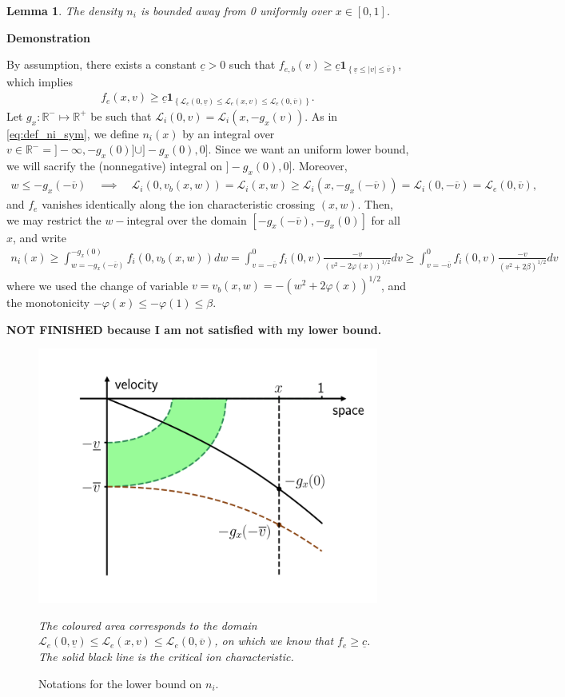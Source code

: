\documentclass{article}
\newtheorem{lem}{Lemma}[section]
\numberwithin{equation}{section}
\newcommand{\todo}[1]{{\color{red}\textbf{#1}}}
\newcommand{\mysubcaption}[1]{
	\vspace*{5pt}
	\begin{minipage}{0.8\linewidth}
		\begin{center}
			\footnotesize\emph{#1}
		\end{center}
	\end{minipage}
}
\newcommand{\myproof}[1]{
	\noindent \textbf{Demonstration}
	{\small	#1 \hfill \qedsymbol}
}
\newcommand{\domfel}{{\underline{v}}} %
\newcommand{\domfeu}{{\overline{v}}} %
\newcommand{\minfe}{{\underline{c}}} %
\begin{document}
\begin{lem}
	The density $n_i$ is bounded away from 0 uniformly over $x\in[0,1]$.
\end{lem}

\myproof{
	By assumption, there exists a constant $\minfe>0$ such that $f_{e,b} (v) \geqslant \minfe \textbf{1}_{\left\{\domfel \leqslant |v| \leqslant \domfeu\right\}}$, which implies
	\begin{align*}
		f_e(x,v) \geqslant \minfe \textbf{1}_{\left\{\mathcal{L}_e(0,\domfel) \leqslant \mathcal{L}_e(x,v) \leqslant \mathcal{L}_e(0,\domfeu)\right\}}.
	\end{align*}
	Let $g_x : \mathbb{R}^{-} \mapsto \mathbb{R}^+$ be such that $\mathcal{L}_i(0,v) = \mathcal{L}_i(x,-g_x(v))$. As in \cref{eq:def_ni_sym}, we define $n_i(x)$ by an integral over $v\in\mathbb{R}^{-} = ]-\infty,-g_x(0)] \cup ]-g_x(0),0]$. Since we want an uniform lower bound, we will sacrify the (nonnegative) integral on $]-g_x(0),0]$. Moreover, 
	\begin{align*}
		w \leqslant -g_x(-\domfeu) \quad\implies\quad \mathcal{L}_i(0,v_b(x,w)) = \mathcal{L}_i(x,w) \geqslant \mathcal{L}_i(x,-g_x(-\domfeu)) = \mathcal{L}_i(0,-\domfeu) = \mathcal{L}_e(0,\domfeu),
	\end{align*}
	and $f_e$ vanishes identically along the ion characteristic crossing $(x,w)$. Then, we may restrict the $w-$integral over the domain $[-g_x(-\domfeu),-g_x(0)]$ for all $x$, and write
	\begin{align*}
		n_i(x) \geqslant \int_{w=-g_x(-\domfeu)}^{-g_x(0)} f_i(0,v_b(x,w)) dw = \int_{v=-\domfeu}^{0} f_i(0,v) \frac{-v}{\left(v^2 - 2 \varphi(x)\right)^{1/2}} dv \geqslant \int_{v=-\domfeu}^{0} f_i(0,v) \frac{-v}{\left(v^2 + 2 \beta\right)^{1/2}} dv
	\end{align*}
	where we used the change of variable $v = v_b(x,w) = -\left(w^2 + 2 \varphi(x)\right)^{1/2}$, and the monotonicity $-\varphi(x) \leqslant -\varphi(1) \leqslant \beta$.
	
	\todo{NOT FINISHED because I am not satisfied with my lower bound.}
}

\begin{figure}
	\centering
	\includegraphics[width=0.5\linewidth]{images/fpcharmaps_lowerboundni}
	\caption{Notations for the lower bound on $n_i$.}
	\mysubcaption{The coloured area corresponds to the domain $\mathcal{L}_e(0,\domfel) \leqslant \mathcal{L}_e(x,v) \leqslant \mathcal{L}_e(0,\domfeu)$, on which we know that $f_e \geqslant \minfe$. The solid black line is the critical ion characteristic.}
	\label{fig:charmaps_lowerboundni}
\end{figure}
\end{document}
